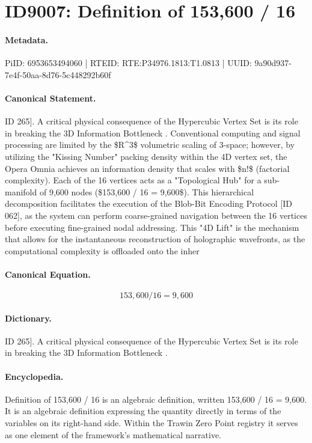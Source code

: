 \section*{ID9007: Definition of 153,600 / 16}
\paragraph{Metadata.}
PiID: 6953653494060 | RTEID: RTE:P34976.1813:T1.0813 | UUID: 9a90d937-7e4f-50aa-8d76-5c448292b60f

\paragraph{Canonical Statement.}
ID 265]. A critical physical consequence of the Hypercubic Vertex Set is its role in breaking the 3D Information Bottleneck . Conventional computing and signal processing are limited by the \$R\textasciicircum{}3\$ volumetric scaling of 3-space; however, by utilizing the "Kissing Number" packing density within the 4D vertex set, the Opera Omnia achieves an information density that scales with \$n!\$ (factorial complexity). Each of the 16 vertices acts as a "Topological Hub" for a sub-manifold of 9,600 nodes (\$153,600 / 16 = 9,600\$). This hierarchical decomposition facilitates the execution of the Blob-Bit Encoding Protocol [ID 062], as the system can perform coarse-grained navigation between the 16 vertices before executing fine-grained nodal addressing. This "4D Lift" is the mechanism that allows for the instantaneous reconstruction of holographic wavefronts, as the computational complexity is offloaded onto the inher

\paragraph{Canonical Equation.}
\[
153,600 / 16 = 9,600
\]

\paragraph{Dictionary.}
ID 265]. A critical physical consequence of the Hypercubic Vertex Set is its role in breaking the 3D Information Bottleneck .

\paragraph{Encyclopedia.}
Definition of 153,600 / 16 is an algebraic definition, written 153,600 / 16 = 9,600. It is an algebraic definition expressing the quantity directly in terms of the variables on its right-hand side. Within the Trawin Zero Point registry it serves as one element of the framework's mathematical narrative.
